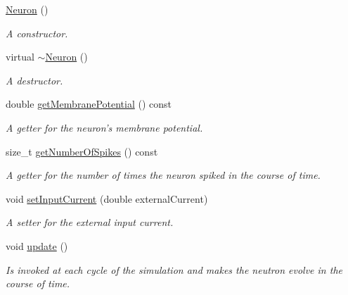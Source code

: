 \begin{DoxyCompactItemize}
\item 
\hypertarget{classNeuron_a823487d01615fadb8ac19a2768dd9d96}{\hyperlink{classNeuron_a823487d01615fadb8ac19a2768dd9d96}{Neuron} ()}\label{classNeuron_a823487d01615fadb8ac19a2768dd9d96}

\begin{DoxyCompactList}\small\item\em A constructor. \end{DoxyCompactList}\item 
\hypertarget{classNeuron_a94a250ce7e167760e593979b899745b1}{virtual \hyperlink{classNeuron_a94a250ce7e167760e593979b899745b1}{$\sim$\-Neuron} ()}\label{classNeuron_a94a250ce7e167760e593979b899745b1}

\begin{DoxyCompactList}\small\item\em A destructor. \end{DoxyCompactList}\item 
double \hyperlink{classNeuron_a86341dee7a81765fe4840777a008c688}{get\-Membrane\-Potential} () const 
\begin{DoxyCompactList}\small\item\em A getter for the neuron's membrane potential. \end{DoxyCompactList}\item 
size\-\_\-t \hyperlink{classNeuron_a9497c01c1513b480cb96488e104c8b00}{get\-Number\-Of\-Spikes} () const 
\begin{DoxyCompactList}\small\item\em A getter for the number of times the neuron spiked in the course of time. \end{DoxyCompactList}\item 
void \hyperlink{classNeuron_ae77210c7b0bf3739b01ec2e3dba96827}{set\-Input\-Current} (double external\-Current)
\begin{DoxyCompactList}\small\item\em A setter for the external input current. \end{DoxyCompactList}\item 
void \hyperlink{classNeuron_a782b3b728eee5097ab205a7a7990225b}{update} ()
\begin{DoxyCompactList}\small\item\em Is invoked at each cycle of the simulation and makes the neutron evolve in the course of time. \end{DoxyCompactList}\item 

\end{DoxyCompactItemize}
